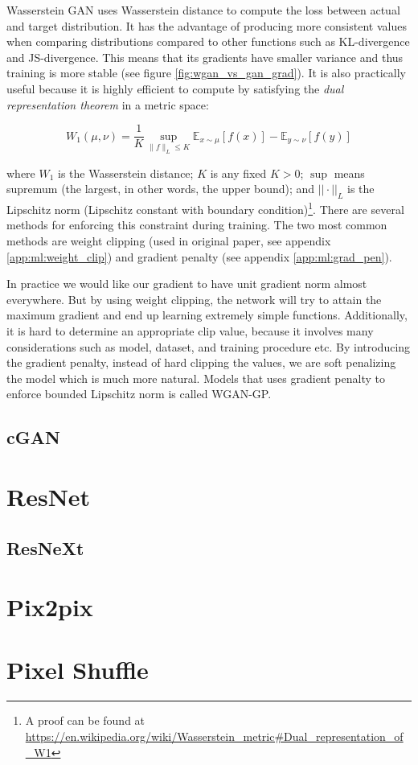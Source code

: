 Wasserstein GAN uses Wasserstein distance to compute the loss between actual and target distribution. It has the advantage of producing more consistent values when comparing distributions compared to other functions such as KL-divergence and JS-divergence. This means that its gradients have smaller variance and thus training is more stable (see figure \ref{fig:wgan_vs_gan_grad}). It is also practically useful because it is highly efficient to compute by satisfying the \textit{dual representation theorem} in a metric space:

$$
W_{1}(\mu, \nu)=\frac{1}{K} \sup _{\|f\|_{L} \leq K} \mathbb{E}_{x \sim \mu}[f(x)]-\mathbb{E}_{y \sim \nu}[f(y)]
$$

where $W_1$ is the Wasserstein distance; $K$ is any fixed $K > 0$; $\sup$ means supremum (the largest, in other words, the upper bound); and $||\cdot||_L$ is the Lipschitz norm (Lipschitz constant with boundary condition)\footnote{A proof can be found at \url{https://en.wikipedia.org/wiki/Wasserstein\_metric\#Dual\_representation\_of\_W1}}. There are several methods for enforcing this constraint during training. The two most common methods are weight clipping (used in original paper, see appendix \ref{app:ml:weight_clip}) and gradient penalty (see appendix \ref{app:ml:grad_pen}).

In practice we would like our gradient to have unit gradient norm almost everywhere. But by using weight clipping, the network will try to attain the maximum gradient and end up learning extremely simple functions\cite{gulrajaniImprovedTrainingWasserstein2017}. Additionally, it is hard to determine an appropriate clip value, because it involves many considerations such as model, dataset, and training procedure etc. By introducing the gradient penalty, instead of hard clipping the values, we are soft penalizing the model which is much more natural. Models that uses gradient penalty to enforce bounded Lipschitz norm is called WGAN-GP.

\subsection{cGAN}

\section{ResNet}

\subsection{ResNeXt}

\section{Pix2pix}

\section{Pixel Shuffle}
